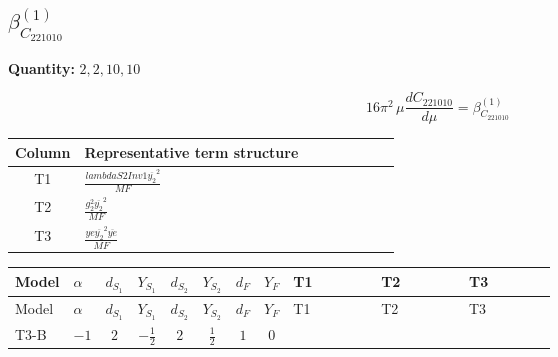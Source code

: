 \documentclass[8pt]{article}
\begin{document}
\begin{landscape}
\section*{$\beta_{C_{221010}}^{(1)}$}
\noindent\textbf{Quantity: }$\mathrm{2,2,10,10}$\par\smallskip
\[16\pi^2\,\mu\frac{d C_{221010}}{d\mu}=\beta_{C_{221010}}^{(1)}\]
\begin{center}
\begin{tabular}{@{}c >{\raggedright\arraybackslash}p{0.82\linewidth}@{}}
\toprule
Column & Representative term structure \\
\midrule
T1 & \(\displaystyle \frac{lambdaS2Inv1 \overline{y_{2}}^{2}}{MF}\) \\
\midrule
T2 & \(\displaystyle \frac{g_{2}^{2} \overline{y_{2}}^{2}}{MF}\) \\
\midrule
T3 & \(\displaystyle \frac{ye \overline{y_{2}}^{2} \overline{ye}}{MF}\) \\
\midrule
\bottomrule
\end{tabular}
\end{center}
\smallskip
\tiny
\begin{longtable}{@{}llcccccc >{\raggedright\arraybackslash}p{0.21\linewidth} >{\raggedright\arraybackslash}p{0.21\linewidth} >{\raggedright\arraybackslash}p{0.21\linewidth}@{}}
\toprule
Model & $\alpha$ & $d_{S_1}$ & $Y_{S_1}$ & $d_{S_2}$ & $Y_{S_2}$ & $d_F$ & $Y_F$ & T1 & T2 & T3 \\
\midrule
\endfirsthead
\toprule
Model & $\alpha$ & $d_{S_1}$ & $Y_{S_1}$ & $d_{S_2}$ & $Y_{S_2}$ & $d_F$ & $Y_F$ & T1 & T2 & T3 \\
\midrule
\endhead
T3-B & $-1$ & $2$ & $-\frac{1}{2}$ & $2$ & $\frac{1}{2}$ & $1$ & $0$ & \scriptsize\adjustbox{max width=\linewidth}{$\begin{gathered} \frac{lambdaS2Inv1 \overline{y_{2}}^{2}}{2 MF}\end{gathered}$} & \scriptsize\adjustbox{max width=\linewidth}{$\begin{gathered} \frac{3 g_{2}^{2} \overline{y_{2}}^{2}}{4 MF}\end{gathered}$} & \scriptsize\adjustbox{max width=\linewidth}{$\begin{gathered} - \frac{ye \overline{y_{2}}^{2} \overline{ye}}{4 MF}\end{gathered}$} \\
\midrule
\bottomrule
\end{longtable}
\end{landscape}
\end{document}
